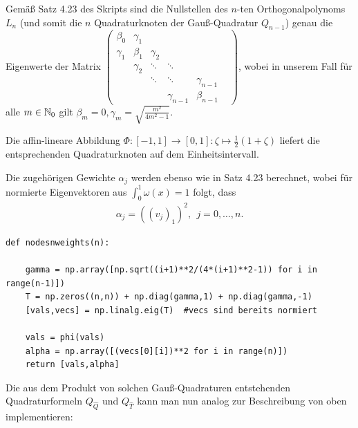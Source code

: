 Gemäß Satz 4.23 des Skripts sind die Nullstellen des $n$-ten Orthogonalpolynoms $L_{n}$ (und somit die $n$ Quadraturknoten der Gauß-Quadratur $Q_{n-1}$) genau die Eigenwerte der Matrix\newline
$
\left(\begin{array}{cccccc}                                
                \beta_{0} & \gamma_{1} &&& \\               \gamma_{1} & \beta_{1} & \gamma_{2} && \\
                & \gamma_{2} & \ddots & \ddots && \\
                && \ddots & \ddots & \gamma_{n-1} \\
                &&& \gamma_{n-1} & \beta_{n-1}
                \end{array}
                \right)$, wobei in unserem Fall für alle $m \in \mathbb{N}_{0}$ gilt $\beta_{m}=0, \gamma_{m}=\sqrt{\frac{m^{2}}{4m^{2}-1}}.$
                
                
Die affin-lineare Abbildung 
$
    \Phi : [-1,1] \to [0,1] : \zeta \mapsto \frac{1}{2}(1+\zeta)
$
liefert die entsprechenden Quadraturknoten auf dem Einheitsintervall.

Die zugehörigen Gewichte $\alpha_{j}$ werden ebenso wie in Satz 4.23 berechnet, wobei für normierte Eigenvektoren aus $\int_{0}^{1}\omega(x) = 1$ folgt, dass
\begin{align*}
    \alpha_{j} = ((v_{j})_{1})^{2},~~j = 0,\dots,n.
\end{align*}

\lstset{language=Python}
\lstset{frame=lines}
\lstset{basicstyle=\footnotesize}
\begin{lstlisting}
def nodesnweights(n): 

    gamma = np.array([np.sqrt((i+1)**2/(4*(i+1)**2-1)) for i in range(n-1)])
    T = np.zeros((n,n)) + np.diag(gamma,1) + np.diag(gamma,-1)
    [vals,vecs] = np.linalg.eig(T)  #vecs sind bereits normiert
    
    vals = phi(vals)
    alpha = np.array([(vecs[0][i])**2 for i in range(n)]) 
    return [vals,alpha] 
\end{lstlisting}
\hspace{10pt}

Die aus dem Produkt von solchen Gauß-Quadraturen entstehenden Quadraturformeln $Q_{\hat{Q}}$ und $Q_{\hat{T}}$ kann man nun analog zur Beschreibung von oben implementieren:


